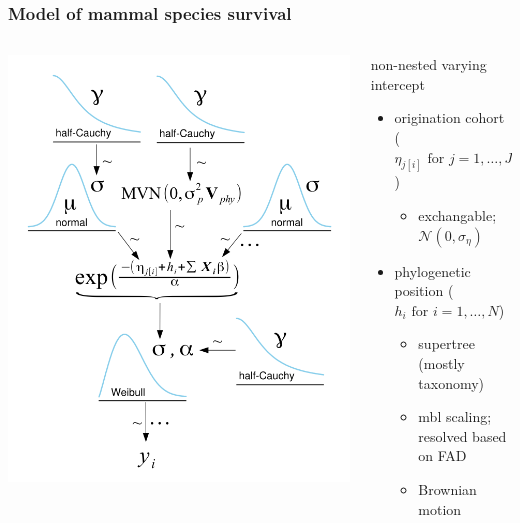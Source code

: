 \documentclass{beamer}
\begin{document}
\begin{frame}
  \frametitle{Model of mammal species survival}

  \begin{columns}
    \begin{column}{0.5\textwidth}
      \includegraphics[width=\textwidth,keepaspectratio=true]{figure/mammal_model}
    \end{column}
    \begin{column}{0.5\textwidth}
      non-nested varying intercept
      \begin{itemize}
        \item origination cohort (\(\eta_{j[i]} \text{ for } j = 1,\dots,J\))
          \begin{itemize}
            \item exchangable; \(\mathcal{N}(0, \sigma_{\eta})\)
          \end{itemize}
        \item phylogenetic position (\(h_{i} \text{ for } i = 1,\dots,N\))
          \begin{itemize}
            \item supertree \\(mostly taxonomy)
            \item mbl scaling; \\resolved based on FAD
            \item Brownian motion
          \end{itemize}
      \end{itemize}
    \end{column}
  \end{columns}
\end{frame}
\end{document}

